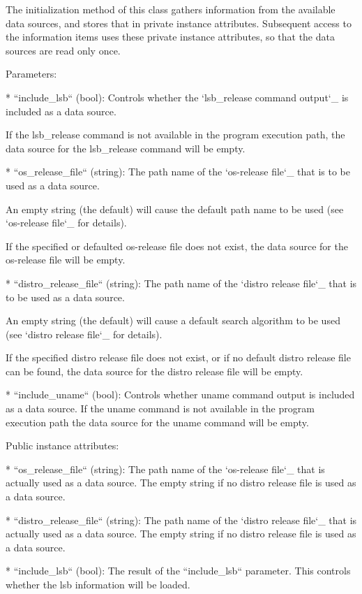 \begin{DoxyVerb}The initialization method of this class gathers information from the
available data sources, and stores that in private instance attributes.
Subsequent access to the information items uses these private instance
attributes, so that the data sources are read only once.

Parameters:

* ``include_lsb`` (bool): Controls whether the
  `lsb_release command output`_ is included as a data source.

  If the lsb_release command is not available in the program execution
  path, the data source for the lsb_release command will be empty.

* ``os_release_file`` (string): The path name of the
  `os-release file`_ that is to be used as a data source.

  An empty string (the default) will cause the default path name to
  be used (see `os-release file`_ for details).

  If the specified or defaulted os-release file does not exist, the
  data source for the os-release file will be empty.

* ``distro_release_file`` (string): The path name of the
  `distro release file`_ that is to be used as a data source.

  An empty string (the default) will cause a default search algorithm
  to be used (see `distro release file`_ for details).

  If the specified distro release file does not exist, or if no default
  distro release file can be found, the data source for the distro
  release file will be empty.

* ``include_uname`` (bool): Controls whether uname command output is
  included as a data source. If the uname command is not available in
  the program execution path the data source for the uname command will
  be empty.

Public instance attributes:

* ``os_release_file`` (string): The path name of the
  `os-release file`_ that is actually used as a data source. The
  empty string if no distro release file is used as a data source.

* ``distro_release_file`` (string): The path name of the
  `distro release file`_ that is actually used as a data source. The
  empty string if no distro release file is used as a data source.

* ``include_lsb`` (bool): The result of the ``include_lsb`` parameter.
  This controls whether the lsb information will be loaded.


\end{DoxyVerb}
